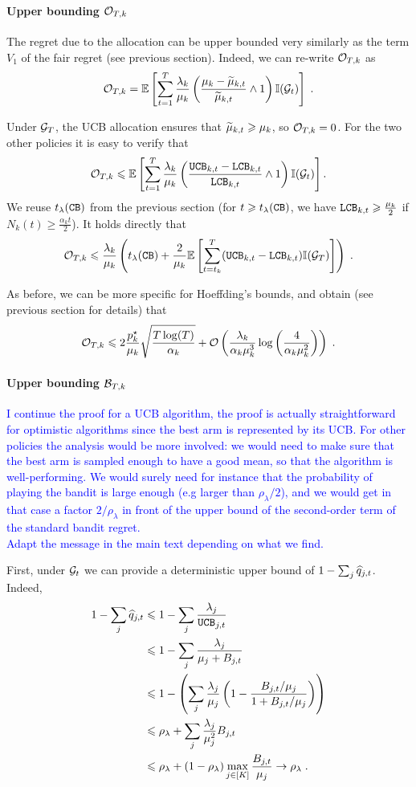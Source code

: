 \paragraph{Upper bounding $\mathcal{O}_{T, k}$} The regret due to the allocation can be upper bounded very similarly as the term $V_1$ of the fair regret (see previous section). Indeed, we can re-write $\mathcal{O}_{T,k}$ as 
\[\mathcal{O}_{T,k} =\mathbb{E}\left[\sum_{t=1}^T \frac{\lambda_k}{\mu_k}\left(\frac{\mu_k-\widetilde{\mu}_{k, t}}{\widetilde{\mu}_{k, t}} \wedge 1 \right) \mathbb{I}(\mathcal{G}_t)\right] \;.  \]

Under $\mathcal{G}_T$, the UCB allocation ensures that $\widetilde{\mu}_{k, t}\geqslant \mu_k$, so $\mathcal{O}_{T,k}=0$. For the two other policies it is easy to verify that 
\[ \mathcal{O}_{T,k} \leqslant \mathbb{E}\left[\sum_{t=1}^T \frac{\lambda_k}{\mu_k}\left(\frac{\texttt{UCB}_{k, t}- \texttt{LCB}_{k, t}}{\texttt{LCB}_{k, t}}\wedge 1\right) \mathbb{I}(\mathcal{G}_t)\right].\]
We reuse $t_\lambda(\texttt{CB})$ from the previous section (for $t\geqslant t_\lambda(\texttt{CB})$, we have $\texttt{LCB}_{k,t}\geqslant \frac{\mu_k}{2}$ if $N_k(t)\geq \frac{\alpha_k t}{2}$). It holds directly that 
\[\mathcal{O}_{T,k} \leqslant \frac{\lambda_k}{\mu_k} \left(t_\lambda(\texttt{CB}) + \frac{2}{\mu_k}\mathbb{E}\left[\sum_{t=t_k}^T (\texttt{UCB}_{k, t}- \texttt{LCB}_{k, t}) \mathbb{I}(\mathcal{G}_T)\right] \right) \;. \]

As before, we can be more specific for Hoeffding's bounds, and obtain (see previous section for details) that
\[ \mathcal{O}_{T,k} \leqslant 2\frac{p_k^\star}{\mu_k}\sqrt{\frac{T\log(T)}{\alpha_k}} + \mathcal{O}\left(\frac{\lambda_k}{\alpha_k \mu_k^3}\log\left(\frac{4}{\alpha_k \mu_k^2}\right)\right)  \;. \]

\paragraph{Upper bounding $\mathcal{B}_{T, k}$} \textcolor{blue}{I continue the proof for a UCB algorithm, the proof is actually straightforward for optimistic algorithms since the best arm is represented by its UCB. For other policies the analysis would be more involved: we would need to make sure that the best arm is sampled enough to have a good mean, so that the algorithm is well-performing. We would surely need for instance that the probability of playing the bandit is large enough (e.g larger than $\rho_\lambda/2$), and we would get in that case a factor $2/\rho_\lambda$ in front of the upper bound of the second-order term of the standard bandit regret.\\
Adapt the message in the main text depending on what we find.}

First, under $\mathcal{G}_t$ we can provide a deterministic upper bound of $1-\sum_j \widehat{q}_{j,t} $. Indeed,
\begin{align*}
1-\sum_j \widehat{q}_{j,t} & \leqslant 1 - \sum_j \frac{\lambda_j}{\texttt{UCB}_{j,t}} \\
& \leqslant 1- \sum_j \frac{\lambda_j}{\mu_j + B_{j,t}} \\
& \leqslant 1- \left(\sum_j \frac{\lambda_j}{\mu_j}\left(1- \frac{B_{j, t}/\mu_j}{1+B_{j,t}/\mu_j}\right) \right) \\
& \leqslant \rho_\lambda + \sum_j \frac{\lambda_j}{\mu_j^2} B_{j,t}\\
&\leqslant \rho_\lambda + (1-\rho_\lambda)\max_{j \in[K]} \frac{B_{j,t}}{\mu_j} \to \rho_\lambda \;.
\end{align*}

